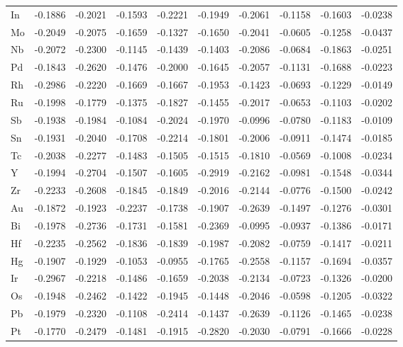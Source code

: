 \begin{table}[htbp]
{\begin{tabular}{l *{9}{l}}
      In & -0.1886 & -0.2021 & -0.1593 & -0.2221 & -0.1949 & -0.2061 & -0.1158 & -0.1603 & -0.0238 \\
      Mo & -0.2049 & -0.2075 & -0.1659 & -0.1327 & -0.1650 & -0.2041 & -0.0605 & -0.1258 & -0.0437 \\
      Nb & -0.2072 & -0.2300 & -0.1145 & -0.1439 & -0.1403 & -0.2086 & -0.0684 & -0.1863 & -0.0251 \\
      Pd & -0.1843 & -0.2620 & -0.1476 & -0.2000 & -0.1645 & -0.2057 & -0.1131 & -0.1688 & -0.0223 \\
      Rh & -0.2986 & -0.2220 & -0.1669 & -0.1667 & -0.1953 & -0.1423 & -0.0693 & -0.1229 & -0.0149 \\
      Ru & -0.1998 & -0.1779 & -0.1375 & -0.1827 & -0.1455 & -0.2017 & -0.0653 & -0.1103 & -0.0202 \\
      Sb & -0.1938 & -0.1984 & -0.1084 & -0.2024 & -0.1970 & -0.0996 & -0.0780 & -0.1183 & -0.0109 \\
      Sn & -0.1931 & -0.2040 & -0.1708 & -0.2214 & -0.1801 & -0.2006 & -0.0911 & -0.1474 & -0.0185 \\
      Tc & -0.2038 & -0.2277 & -0.1483 & -0.1505 & -0.1515 & -0.1810 & -0.0569 & -0.1008 & -0.0234 \\
      Y  & -0.1994 & -0.2704 & -0.1507 & -0.1605 & -0.2919 & -0.2162 & -0.0981 & -0.1548 & -0.0344 \\
      Zr & -0.2233 & -0.2608 & -0.1845 & -0.1849 & -0.2016 & -0.2144 & -0.0776 & -0.1500 & -0.0242 \\
      Au & -0.1872 & -0.1923 & -0.2237 & -0.1738 & -0.1907 & -0.2639 & -0.1497 & -0.1276 & -0.0301 \\
      Bi & -0.1978 & -0.2736 & -0.1731 & -0.1581 & -0.2369 & -0.0995 & -0.0937 & -0.1386 & -0.0171 \\
      Hf & -0.2235 & -0.2562 & -0.1836 & -0.1839 & -0.1987 & -0.2082 & -0.0759 & -0.1417 & -0.0211 \\
      Hg & -0.1907 & -0.1929 & -0.1053 & -0.0955 & -0.1765 & -0.2558 & -0.1157 & -0.1694 & -0.0357 \\
      Ir & -0.2967 & -0.2218 & -0.1486 & -0.1659 & -0.2038 & -0.2134 & -0.0723 & -0.1326 & -0.0200 \\
      Os & -0.1948 & -0.2462 & -0.1422 & -0.1945 & -0.1448 & -0.2046 & -0.0598 & -0.1205 & -0.0322 \\
      Pb & -0.1979 & -0.2320 & -0.1108 & -0.2414 & -0.1437 & -0.2639 & -0.1126 & -0.1465 & -0.0238 \\
      Pt & -0.1770 & -0.2479 & -0.1481 & -0.1915 & -0.2820 & -0.2030 & -0.0791 & -0.1666 & -0.0228 \\

\end{tabular}}
\end{table}
